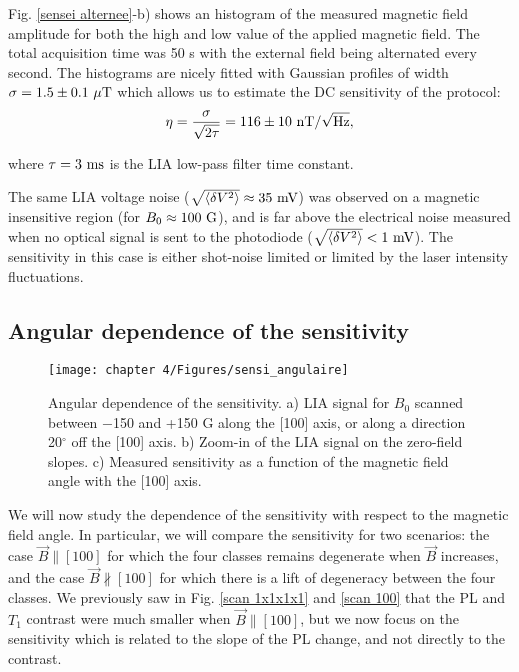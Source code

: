 \documentclass[a4paper, 11pt]{report}
\begin{document}
Fig. \ref{sensei alternee}-b) shows an histogram of the measured magnetic field amplitude for both the high and low value of the applied magnetic field. The total acquisition time was 50 s with the external field being alternated every second. The histograms are nicely fitted with Gaussian profiles of width $\sigma=1.5\pm 0.1\ \rm{\mu T}$ which allows us to estimate the DC sensitivity of the protocol:
\begin{equation}
\eta = \frac{\sigma}{\sqrt{2 \tau}}= 116 \pm 10\ \rm{nT} / \sqrt{\rm Hz},
\end{equation}

where $\tau=3\ \rm ms$ is the LIA low-pass filter time constant. 

The same LIA voltage noise ($\sqrt{\langle \delta V^2 \rangle} \approx 35\ \rm mV$) was observed on a magnetic insensitive region (for $B_0 \approx 100\ \rm G$), and is far above the electrical noise measured when no optical signal is sent to the photodiode ($\sqrt{\langle \delta V^2 \rangle} < 1\ \rm mV$). The sensitivity in this case is either shot-noise limited or limited by the laser intensity fluctuations.

\subsection{Angular dependence of the sensitivity}
\label{sec angular sensi}
\begin{figure}[h!]
\centering
\texttt{[image: chapter 4/Figures/sensi\_angulaire]}
\caption{Angular dependence of the sensitivity. a) LIA signal for $B_0$ scanned between $-$150 and +150 G along the [100] axis, or along a direction 20$^\circ$ off the [100] axis. b) Zoom-in of the LIA signal on the zero-field slopes. c) Measured sensitivity as a function of the magnetic field angle with the [100] axis.}
\label{angular sensi}
\end{figure}

We will now study the dependence of the sensitivity with respect to the magnetic field angle. In particular, we will compare the sensitivity for two scenarios: the case $\vec{B}\parallel [100]$ for which the four classes remains degenerate when $\vec{B}$ increases, and the case $\vec{B}\nparallel [100]$ for which there is a lift of degeneracy between the four classes. We previously saw in Fig. \ref{scan 1x1x1x1} and \ref{scan 100} that the PL and $T_1$ contrast were much smaller when $\vec{B}\parallel [100]$, but we now focus on the sensitivity which is related to the slope of the PL change, and not directly to the contrast.
\end{document}
